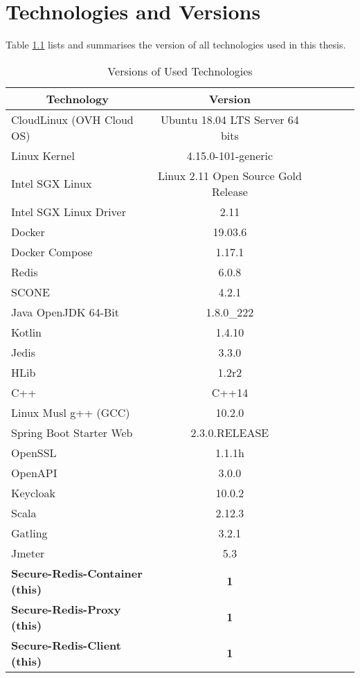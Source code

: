 \chapter{Technologies and Versions}
\label{ann:technologies_and_versions}

Table \ref{tab:versions_of_used_technologies} lists and summarises the version of all technologies used in this thesis.

\begin{table}[ht]
	\caption{Versions of Used Technologies}
	\label{tab:versions_of_used_technologies}
\centering
\begin{tabular}{lccccc}
	\toprule
	\multicolumn{1}{c}{\textbf{Technology}} 	& \multicolumn{1}{c}{\textbf{Version}} \\
	\midrule
		CloudLinux (OVH Cloud OS) 			& 		Ubuntu 18.04 LTS Server 64 bits 	\\
		Linux Kernel						&		4.15.0-101-generic					\\
		Intel SGX Linux						&		Linux 2.11 Open Source Gold Release \\
		Intel SGX Linux	Driver				&		2.11 								\\
		Docker								& 		19.03.6 								\\
		Docker Compose						& 		1.17.1 								\\
		Redis								& 		6.0.8 								\\
		SCONE 								& 		4.2.1 								\\
		Java OpenJDK 64-Bit 					& 		1.8.0\_222							\\
		Kotlin 								& 		1.4.10								\\
		Jedis								&		3.3.0								\\
		HLib								&		1.2r2								\\
		C++									& 		C++14								\\
		Linux Musl g++ (GCC)					& 		10.2.0								\\
		Spring Boot Starter	Web				& 		2.3.0.RELEASE						\\
		OpenSSL								&		1.1.1h								\\
		OpenAPI								&		3.0.0								\\
		Keycloak							& 		10.0.2								\\
		Scala								& 		2.12.3								\\
		Gatling								& 		3.2.1								\\
		Jmeter								&		5.3									\\
	\midrule
	\textbf{Secure-Redis-Container (this)}	&		\textbf{1}							\\
	\textbf{Secure-Redis-Proxy (this)}		&		\textbf{1}							\\
	\textbf{Secure-Redis-Client	(this)}		&		\textbf{1}							\\
	\bottomrule
\end{tabular}
\end{table}
